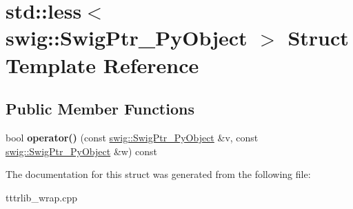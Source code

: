 \hypertarget{structstd_1_1less_3_01swig_1_1_swig_ptr___py_object_01_4}{}\section{std\+:\+:less$<$ swig\+:\+:Swig\+Ptr\+\_\+\+Py\+Object $>$ Struct Template Reference}
\label{structstd_1_1less_3_01swig_1_1_swig_ptr___py_object_01_4}
\subsection*{Public Member Functions}
\begin{DoxyCompactItemize}
\item 
\mbox{\label{structstd_1_1less_3_01swig_1_1_swig_ptr___py_object_01_4_a4f69d736de91a5450e95bcee12b5b512}} 
bool {\bfseries operator()} (const \hyperlink{classswig_1_1_swig_ptr___py_object}{swig\+::\+Swig\+Ptr\+\_\+\+Py\+Object} \&v, const \hyperlink{classswig_1_1_swig_ptr___py_object}{swig\+::\+Swig\+Ptr\+\_\+\+Py\+Object} \&w) const
\end{DoxyCompactItemize}


The documentation for this struct was generated from the following file\+:\begin{DoxyCompactItemize}
\item 
tttrlib\+\_\+wrap.\+cpp\end{DoxyCompactItemize}
